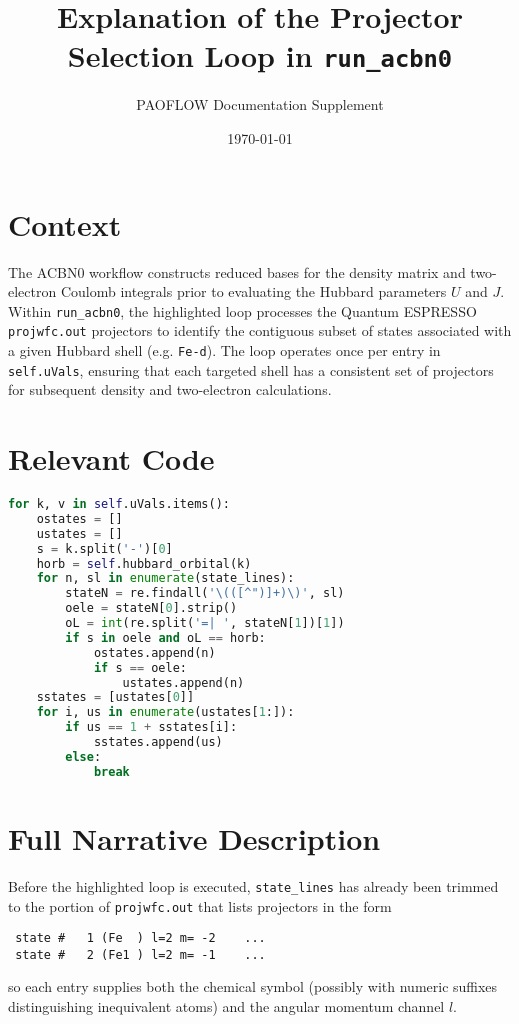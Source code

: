 \documentclass[11pt]{article}
\title{Explanation of the Projector Selection Loop in \texttt{run\_acbn0}}
\author{PAOFLOW Documentation Supplement}
\date{\today}
\begin{document}
\maketitle

\section{Context}
The ACBN0 workflow constructs reduced bases for the density matrix and two-electron Coulomb integrals prior to evaluating the Hubbard parameters $U$ and $J$. Within \texttt{run\_acbn0}, the highlighted loop processes the Quantum ESPRESSO \texttt{projwfc.out} projectors to identify the contiguous subset of states associated with a given Hubbard shell (e.g.	\texttt{Fe-d}). The loop operates once per entry in \verb|self.uVals|, ensuring that each targeted shell has a consistent set of projectors for subsequent density and two-electron calculations.

\section{Relevant Code}
\begin{lstlisting}[language=python]
for k, v in self.uVals.items():
    ostates = []
    ustates = []
    s = k.split('-')[0]
    horb = self.hubbard_orbital(k)
    for n, sl in enumerate(state_lines):
        stateN = re.findall('\(([^")]+)\)', sl)
        oele = stateN[0].strip()
        oL = int(re.split('=| ', stateN[1])[1])
        if s in oele and oL == horb:
            ostates.append(n)
            if s == oele:
                ustates.append(n)
    sstates = [ustates[0]]
    for i, us in enumerate(ustates[1:]):
        if us == 1 + sstates[i]:
            sstates.append(us)
        else:
            break
\end{lstlisting}

\section{Full Narrative Description}
Before the highlighted loop is executed, \texttt{state\_lines} has already been trimmed to the portion of \texttt{projwfc.out} that lists projectors in the form
\begin{lstlisting}
 state #   1 (Fe  ) l=2 m= -2    ...
 state #   2 (Fe1 ) l=2 m= -1    ...
\end{lstlisting}
so each entry supplies both the chemical symbol (possibly with numeric suffixes distinguishing inequivalent atoms) and the angular momentum channel \(l\).
\end{document}
